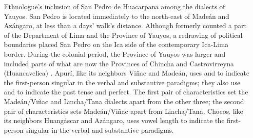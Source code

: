 Ethnologue’s inclusion of San Pedro de Huacarpana among the dialects of Yauyos. San Pedro is located immediately to the north-east of Madeán and Azángaro, at less than a days’ walk’s distance. Although formerly counted a part of the Department of Lima and the Province of Yauyos, a redrawing of political boundaries placed San Pedro on the Ica side of the contemporary Ica-Lima border. During the colonial period, the Province of Yauyos was larger and included parts of what are now the Provinces of Chincha and Castrovirreyna (Huancavelica) \citet[1.1.3.2.7]{Landerman91}. Apurí, like its neighbors Viñac and Madeán, uses  and  to indicate the first-person singular in the verbal and substantive paradigms; they also use  and  to indicate the past tense and perfect. The first pair of characteristics set the Madeán/Viñac and Lincha/Tana dialects apart from the other three; the second pair of characteristics sets Madeán/Viñac apart from Lincha/Tana. Chocos, like its neighbors Huangáscar and Azángaro, uses vowel length to indicate the first-person singular in the verbal and substantive paradigms.

